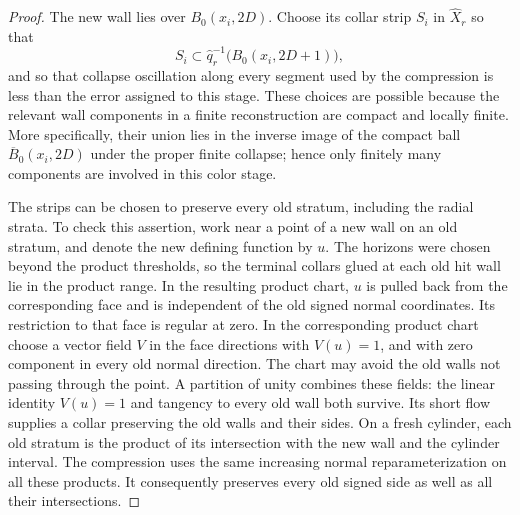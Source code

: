 \begin{proof}
The new wall lies over $B_0(x_i,2D)$.  Choose its collar strip $S_i$ in
$\widehat X_r$ so that
\begin{equation}\label{topology:strip}
 S_i\subset\widehat q_r^{-1}\bigl(B_0(x_i,2D+1)\bigr),
\end{equation}
and so that collapse oscillation along every segment used by the
compression is less than the error assigned to this stage.  These
choices are possible because the relevant wall components in a finite
reconstruction are compact and locally finite.  More specifically,
their union lies in the inverse image of the compact ball
$\overline B_0(x_i,2D)$ under the proper finite collapse; hence only
finitely many components are involved in this color stage.

The strips can be chosen to preserve every old stratum, including the
radial strata.  To check this assertion, work near a point of a new wall
on an old stratum, and denote the new defining function by $u$.
The horizons were chosen beyond the product thresholds, so the terminal
collars glued at each old hit wall lie in the product range.  In the
resulting product chart, $u$ is pulled back from the corresponding face
and is independent of the old signed normal coordinates.  Its restriction
to that face is regular at zero.  In the corresponding product chart choose a vector field
$V$ in the face directions with $V(u)=1$, and with zero component in
every old normal direction.  The chart may avoid the old walls not
passing through the point.  A partition of unity combines these fields:
the linear identity $V(u)=1$ and tangency to every old wall both survive.
Its short flow supplies a collar preserving the old walls and their
sides.  On a fresh cylinder, each old stratum is the product of its
intersection with the new wall and the cylinder interval.  The
compression uses the same increasing normal reparameterization on
all these products.  It consequently preserves every old signed side
as well as all their intersections.


\end{proof}
